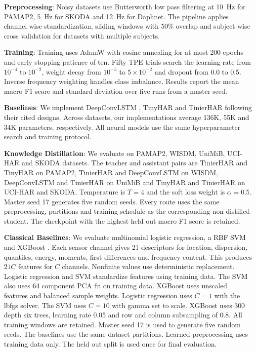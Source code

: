 \documentclass[conference,twocolumn]{IEEEtran}
\begin{document}
\textbf{Preprocessing}: Noisy datasets use Butterworth low pass filtering at 10~Hz for PAMAP2, 5~Hz for SKODA and 12~Hz for Daphnet. The pipeline applies channel wise standardization, sliding windows with 50\% overlap and subject wise cross validation for datasets with multiple subjects.

\textbf{Training}: Training uses AdamW with cosine annealing for at most 200 epochs and early stopping patience of ten. Fifty TPE trials search the learning rate from $10^{-4}$ to $10^{-2}$, weight decay from $10^{-5}$ to $5{\times}10^{-2}$ and dropout from 0.0 to 0.5. Inverse frequency weighting handles class imbalance. Results report the mean macro F1 score and standard deviation over five runs from a master seed.

\textbf{Baselines}: We implement DeepConvLSTM \cite{ordonez2016deep}, TinyHAR \cite{zhou2022tinyhar} and TinierHAR \cite{bian2025tinierhar} following their cited designs. Across datasets, our implementations average 136K, 55K and 34K parameters, respectively. All neural models use the same hyperparameter search and training protocol.

\textbf{Knowledge Distillation}: We evaluate on PAMAP2, WISDM, UniMiB, UCI-HAR and SKODA datasets. The teacher and assistant pairs are TinierHAR and TinyHAR on PAMAP2, TinierHAR and DeepConvLSTM on WISDM, DeepConvLSTM and TinierHAR on UniMiB and TinyHAR and TinierHAR on UCI-HAR and SKODA. Temperature is $T=4$ and the soft loss weight is $\alpha=0.5$. Master seed 17 generates five random seeds. Every route uses the same preprocessing, partitions and training schedule as the corresponding non distilled student. The checkpoint with the highest held out macro F1 score is retained.

\textbf{Classical Baselines}: We evaluate multinomial logistic regression, a RBF SVM and XGBoost \cite{chen2016xgboost}. Each sensor channel gives 21 descriptors for location, dispersion, quantiles, energy, moments, first differences and frequency content. This produces $21C$ features for $C$ channels. Nonfinite values use deterministic replacement. Logistic regression and SVM standardize features using training data. The SVM also uses 64 component PCA fit on training data. XGBoost uses unscaled features and balanced sample weights. Logistic regression uses $C=1$ with the lbfgs solver. The SVM uses $C=10$ with gamma set to scale. XGBoost uses 300 depth six trees, learning rate 0.05 and row and column subsampling of 0.8. All training windows are retained. Master seed 17 is used to generate five random seeds. The baselines use the same dataset partitions. Learned preprocessing uses training data only. The held out split is used once for final evaluation.
\end{document}
